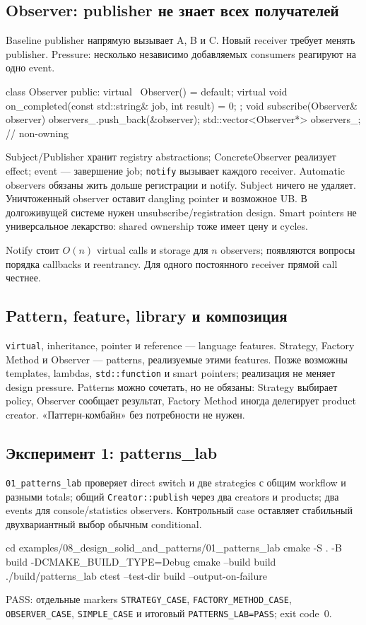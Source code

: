 \subsection{Observer: publisher не знает всех получателей}

Baseline publisher напрямую вызывает A, B и C. Новый receiver требует менять
publisher. Pressure: несколько независимо добавляемых consumers реагируют на
одно event.
\begin{cppcode}
class Observer {
public:
    virtual ~Observer() = default;
    virtual void on_completed(const std::string& job, int result) = 0;
};
void subscribe(Observer& observer) { observers_.push_back(&observer); }
std::vector<Observer*> observers_; // non-owning
\end{cppcode}

Subject/Publisher хранит registry abstractions; ConcreteObserver реализует
effect; event --- завершение job; \texttt{notify} вызывает каждого receiver.
Automatic observers обязаны жить дольше регистрации и notify. Subject ничего
не удаляет. Уничтоженный observer оставит dangling pointer и возможное UB.
В долгоживущей системе нужен unsubscribe/registration design. Smart pointers
не универсальное лекарство: shared ownership тоже имеет цену и cycles.

Notify стоит $O(n)$ virtual calls и storage для $n$ observers; появляются
вопросы порядка callbacks и reentrancy. Для одного постоянного receiver прямой
call честнее.

\subsection{Pattern, feature, library и композиция}

\texttt{virtual}, inheritance, pointer и reference --- language features.
Strategy, Factory Method и Observer --- patterns, реализуемые этими features.
Позже возможны templates, lambdas, \texttt{std::function} и smart pointers;
реализация не меняет design pressure. Patterns можно сочетать, но не обязаны:
Strategy выбирает policy, Observer сообщает результат, Factory Method иногда
делегирует product creator. «Паттерн-комбайн» без потребности не нужен.

\subsection{Эксперимент 1: patterns\_lab}

\texttt{01\_patterns\_lab} проверяет direct switch и две strategies с общим
workflow и разными totals; общий \texttt{Creator::publish} через два creators
и products; два events для console/statistics observers. Контрольный case
оставляет стабильный двухвариантный выбор обычным conditional.
\begin{shellcode}
cd examples/08_design_solid_and_patterns/01_patterns_lab
cmake -S . -B build -DCMAKE_BUILD_TYPE=Debug
cmake --build build
./build/patterns_lab
ctest --test-dir build --output-on-failure
\end{shellcode}
PASS: отдельные markers \texttt{STRATEGY\_CASE},
\texttt{FACTORY\_METHOD\_CASE}, \texttt{OBSERVER\_CASE},
\texttt{SIMPLE\_CASE} и итоговый \texttt{PATTERNS\_LAB=PASS}; exit code~0.

